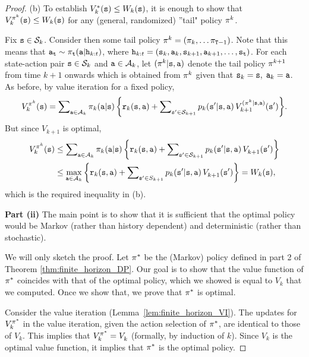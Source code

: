 \begin{proof}
(b) To establish $V_k^{*}({\tt s}) \le {W_k}({\tt s})$, it is enough
to show that $V_k^{{\pi ^k}}({\tt s}) \le {W_k}({\tt s})$ for any
(general, randomized) ''tail" policy ${\pi ^k}$.

Fix ${\tt s} \in {\mathcal{S}_k}$. Consider then some tail policy ${\pi ^k} =
({\pi _k}, \ldots {\pi_{{\tt T}-1}})$. Note that this
means that ${{\tt a}_{\tt t}} \sim {\pi_{\tt t}}({\tt a}|{{\tt h}_{k:t}})$, where ${{\tt h}_{k:t}} =
({{\tt s}_k},{{\tt a}_k},{{\tt s}_{k + 1}},{{\tt a}_{k + 1}}, \ldots
,{{\tt s}_{\tt t}})$. For each state-action pair ${\tt s} \in
{\mathcal{S}_k}$ and ${\tt a} \in {\mathcal{A}_k}$, let $({\pi
^k}|{\tt s},{\tt a})$ denote the tail policy ${\pi ^{k + 1}}$
from time $k + 1$ onwards which is obtained from ${\pi ^k}$
given that ${{\tt s}_k} = {\tt s},\;{{\tt a}_k} = {\tt a}$. As before,
by value iteration for a fixed policy,
\[V_k^{{\pi ^k}}({\tt s}) = \sum\nolimits_{{\tt a} \in {\mathcal{A}_k}} {{\pi _k}({\tt a}|{\tt s})\left\{ {{{\tt r}_k}({\tt s},{\tt a}) + \sum\nolimits_{{\tt s}' \in {\mathcal{S}_{k + 1}}} {{p_k}({\tt s}'|{\tt s},{\tt a})} \,V_{k + 1}^{({\pi ^k}|{\tt s},{\tt a})}({\tt s}')} \right\}} .\]
But since $V_{k + 1}^{}$ is optimal,
\begin{align*}
V_k^{{\pi ^k}}({\tt s}) &\le \sum\nolimits_{{\tt a} \in {\mathcal{A}_k}} {{\pi _k}({\tt a}|{\tt s})\left\{ {{{\tt r}_k}({\tt s},{\tt a}) + \sum\nolimits_{{\tt s}' \in {\mathcal{S}_{k + 1}}} {{p_k}({\tt s}'|{\tt s},{\tt a})\,} V_{k + 1}^{}({\tt s}')} \right\}} \\
 &\le {\max _{{\tt a}\in {\mathcal{A}_k}}}\left\{ {{{\tt r}_k}({\tt s},{\tt a}) + \sum\nolimits_{{\tt s}' \in {S_{k + 1}}} {{p_k}({\tt s}'|{\tt s},{\tt a})\,} V_{k + 1}^{}({\tt s}')} \right\} = {W_k}({\tt s}),
\end{align*}
which is the required inequality in (b).

\textbf{Part  (ii)} The main point is to show that it is
sufficient that the optimal policy would be Markov (rather than
history dependent) and deterministic (rather than stochastic).


We will only sketch the proof.
Let ${\pi ^*}$ be the (Markov) policy defined in part 2 of
Theorem \ref{thm:finite_horizon_DP}. Our goal is to show that the
value function of ${\pi ^*}$ coincides with that of the optimal
policy, which we showed is equal to $V_k$ that we computed. Once we
show that, we prove that ${\pi ^*}$ is optimal.

Consider the value iteration (Lemma~\ref{lem:finite_horizon_VI}).
The updates for $V_k^{{\pi ^*}}$ in the value iteration, given
the action selection of $\pi^*$, are identical to those of
$V_k^{}$. This implies that $V_k^{{\pi ^*}} = V_k^{}$ (formally,
by induction of $k$). Since $V_k$ is the optimal value function, it
implies that $\pi^*$ is the optimal policy.
%
\end{proof}



